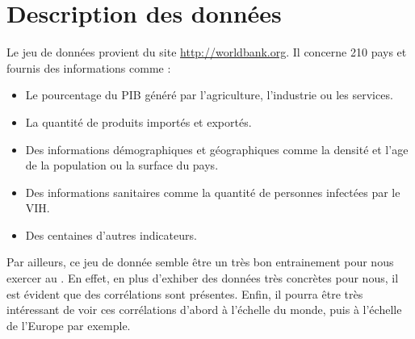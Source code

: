 \section{Description des données}
Le jeu de données provient du site \url{http://worldbank.org}. Il concerne 210 pays et fournis des informations comme :
\begin{itemize}
	\item Le pourcentage du \gls{PIB} généré par l'agriculture, l'industrie ou les services.
	\item La quantité de produits importés et exportés.
	\item Des informations démographiques et géographiques comme la densité et l'age de la population ou la surface du pays.
	\item Des informations sanitaires comme la quantité de personnes infectées par le \gls{VIH}.
	\item Des centaines d'autres indicateurs.
\end{itemize}
Par ailleurs, ce jeu de donnée semble être un très bon entrainement pour nous exercer au . En effet, en plus d'exhiber des données très concrètes pour nous, il est évident que des corrélations sont présentes. Enfin, il pourra être très intéressant de voir ces corrélations d'abord à l'échelle du monde, puis à l'échelle de l'Europe par exemple. 

